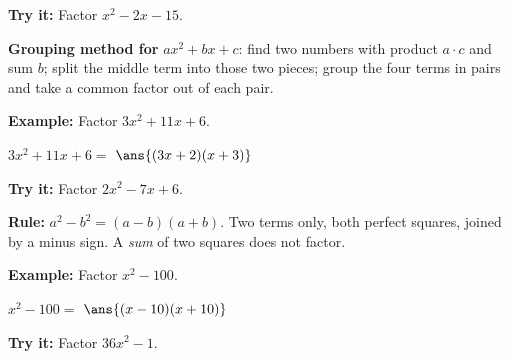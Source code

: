 \documentclass[12pt]{article}
\begin{document}
\begin{tryitbox}
\textbf{Try it:} \quad Factor $x^2 - 2x - 15$.\\[2pt]
\end{tryitbox}


\begin{formulabox}
\textbf{Grouping method for} $ax^2 + bx + c$: find two numbers with product $a \cdot c$ and sum $b$; split the middle term into those two pieces; group the four terms in pairs and take a common factor out of each pair.
\end{formulabox}

\begin{examplebox}
\textbf{Example:} \quad Factor $3x^2 + 11x + 6$.
\par
$3x^2 + 11x + 6 = $ $\ans{(3x+2)(x+3)}$
\end{examplebox}

\begin{tryitbox}
\textbf{Try it:} \quad Factor $2x^2 - 7x + 6$.\\[2pt]
\end{tryitbox}


\begin{formulabox}
\textbf{Rule:} \quad $a^2 - b^2 = (a-b)(a+b)$. Two terms only, both perfect squares, joined by a minus sign. A \emph{sum} of two squares does not factor.
\end{formulabox}

\begin{examplebox}
\textbf{Example:} \quad Factor $x^2 - 100$.
\par
$x^2 - 100 = $ $\ans{(x-10)(x+10)}$
\end{examplebox}

\begin{tryitbox}
\textbf{Try it:} \quad Factor $36x^2 - 1$.\\[2pt]
\end{tryitbox}
\end{document}
